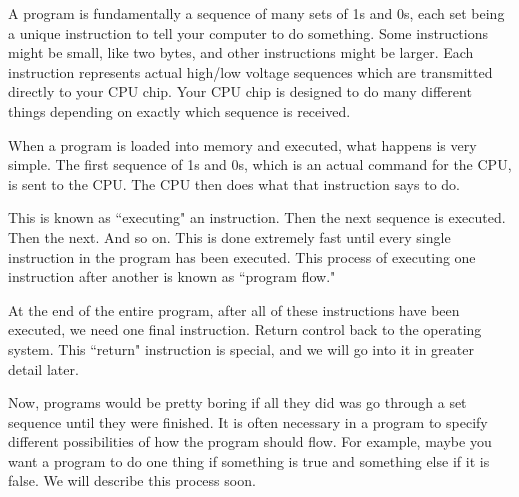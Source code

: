 \documentclass[a4paper,12pt]{article}
\begin{document}
A program is fundamentally a sequence of many sets of 1s and 0s, each set being a unique instruction to tell your computer to do something. Some instructions might be small, like two bytes, and other instructions might be larger. Each instruction represents actual high/low voltage sequences which are transmitted directly to your CPU chip. Your CPU chip is designed to do many different things depending on exactly which sequence is received.

When a program is loaded into memory and executed, what happens is very simple. The first sequence of 1s and 0s, which is an actual command for the CPU, is sent to the CPU. The CPU then does what that instruction says to do.

This is known as ``executing" an instruction. Then the next sequence is executed. Then the next. And so on. This is done extremely fast until every single instruction in the program has been executed. This process of executing one instruction after another is known as ``program flow."

At the end of the entire program, after all of these instructions have been executed, we need one final instruction. Return control back to the operating system. This ``return" instruction is special, and we will go into it in greater detail later.

Now, programs would be pretty boring if all they did was go through a set sequence until they were finished. It is often necessary in a program to specify different possibilities of how the program should flow. For example, maybe you want a program to do one thing if something is true and something else if it is false. We will describe this process soon.
\end{document}
